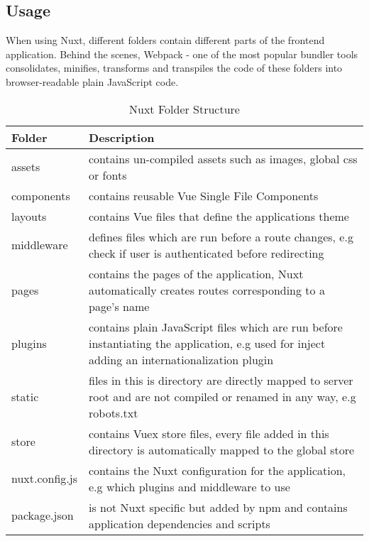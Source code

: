 \subsection{Usage}
When using Nuxt, different folders contain different parts of the frontend application. Behind the scenes, Webpack - one of the most popular bundler tools consolidates, minifies, transforms and transpiles the code of these folders into browser-readable plain JavaScript code. 

\begin{table}
    \begin{tabularx}{\linewidth}{|l|X|}
        \hline
        \textbf{Folder} & \textbf{Description} \\
        \hline
        assets & contains un-compiled assets such as images, global css or fonts  \\
        \hline
        components & contains reusable Vue Single File Components \\
        \hline
        layouts & contains Vue files that define the applications theme \\
        \hline
        middleware & defines files which are run before a route changes, e.g check if user is authenticated before redirecting \\
        \hline
        pages & contains the pages of the application, Nuxt automatically creates routes corresponding to a page's name \\
        \hline
        plugins & contains plain JavaScript files which are run before instantiating the application, e.g used for inject adding an internationalization plugin \\
        \hline
        static & files in this is directory are directly mapped to server root and are not compiled or renamed in any way, e.g robots.txt \\
        \hline
        store & contains Vuex store files, every file added in this directory is automatically mapped to the global store \\
        \hline
        nuxt.config.js & contains the Nuxt configuration for the application, e.g which plugins and middleware to use\\
        \hline
        package.json & is not Nuxt specific but added by npm and contains application dependencies and scripts \\
        \hline
    \end{tabularx}
    \caption{Nuxt Folder Structure}
    \label{table:filestructure}
\end{table}

